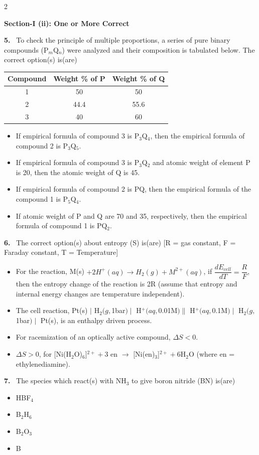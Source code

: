 \documentclass[10pt]{extarticle}
\newcommand{\sect}[1]{\par\smallskip\noindent\textbf{#1}\par}
\newcommand{\qn}[1]{\par\smallskip\noindent\textbf{#1.}~}
\newenvironment{qoptions}{\begin{itemize}[leftmargin=1.8em,itemsep=1pt,topsep=2pt,label={}]}{\end{itemize}}
\newcommand{\opt}[2]{\item[(#1)] #2}
\begin{document}
\begin{multicols}{2}
\sect{Section-I (ii): One or More Correct}

\qn{5} To check the principle of multiple proportions, a series of pure binary compounds (P$_m$Q$_n$) were analyzed and their composition is tabulated below. The correct option(s) is(are)
\begin{center}
\begin{tabular}{|c|c|c|}
\hline
Compound & Weight \% of P & Weight \% of Q \\
\hline
1 & 50 & 50 \\
\hline
2 & 44.4 & 55.6 \\
\hline
3 & 40 & 60 \\
\hline
\end{tabular}
\end{center}
\begin{qoptions}
\opt{A}{If empirical formula of compound 3 is P$_3$Q$_4$, then the empirical formula of compound 2 is P$_3$Q$_5$.}
\opt{B}{If empirical formula of compound 3 is P$_3$Q$_2$ and atomic weight of element P is 20, then the atomic weight of Q is 45.}
\opt{C}{If empirical formula of compound 2 is PQ, then the empirical formula of the compound 1 is P$_5$Q$_4$.}
\opt{D}{If atomic weight of P and Q are 70 and 35, respectively, then the empirical formula of compound 1 is PQ$_2$.}
\end{qoptions}

\qn{6} The correct option(s) about entropy (S) is(are)
[R = gas constant, F = Faraday constant, T = Temperature]
\begin{qoptions}
\opt{A}{For the reaction, M(s) $+ 2H^+(aq)\longrightarrow H_2(g)+M^{2+}(aq)$, if $\dfrac{dE_{cell}}{dT}=\dfrac{R}{F}$, then the entropy change of the reaction is 2R (assume that entropy and internal energy changes are temperature independent).}
\opt{B}{The cell reaction, Pt(s) $\mid$ H$_2(g,$1bar$)\mid$ H$^+(aq,$0.01M$)\parallel$ H$^+(aq,$0.1M$)\mid$ H$_2(g,$1bar$)\mid$ Pt(s), is an enthalpy driven process.}
\opt{C}{For racemization of an optically active compound, $\Delta S<0$.}
\opt{D}{$\Delta S>0$, for [Ni(H$_2$O)$_6$]$^{2+}+3$ en $\longrightarrow$ [Ni(en)$_3$]$^{2+}+6$H$_2$O (where en = ethylenediamine).}
\end{qoptions}

\qn{7} The species which react(s) with NH$_3$ to give boron nitride (BN) is(are)
\begin{qoptions}
\opt{A}{HBF$_4$}
\opt{B}{B$_2$H$_6$}
\opt{C}{B$_2$O$_3$}
\opt{D}{B}
\end{qoptions}


\end{multicols}
\end{document}
